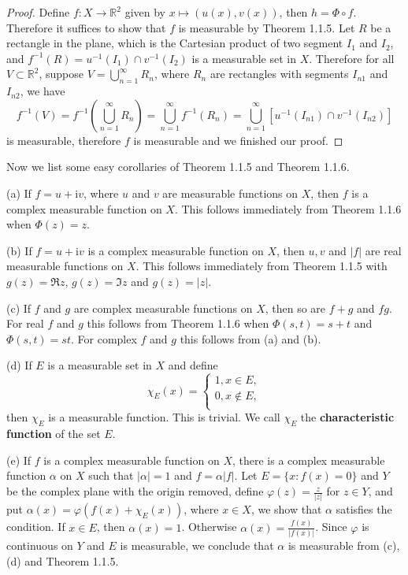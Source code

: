 \begin{proof}
Define $f:X\to\mathbb{R}^2$ given by $x\mapsto(u(x),v(x))$, then $h=\Phi\circ f$. Therefore it suffices to show that $f$ is measurable by Theorem 1.1.5. Let $R$ be a rectangle in the plane, which is the Cartesian product of two segment $I_1$ and $I_2$, and $f^{-1}\left( R \right) =u^{-1}\left( I_1 \right) \cap v^{-1}\left( I_2 \right) $ is a measurable set in $X$. Therefore for all $V\subset\mathbb{R}^2$, suppose $V=\bigcup_{n=1}^\infty R_n$, where $R_n$ are rectangles with segments $I_{n1}$ and $I_{n2}$, we have 
$$
f^{-1}\left( V \right) =f^{-1}\left( \bigcup_{n=1}^{\infty}{R_n} \right) =\bigcup_{n=1}^{\infty}{f^{-1}\left( R_n \right)}=\bigcup_{n=1}^{\infty}{\left[ u^{-1}\left( I_{n1} \right) \cap v^{-1}\left( I_{n2} \right) \right]}
$$
is measurable, therefore $f$ is measurable and we finished our proof.
\end{proof}
Now we list some easy corollaries of Theorem 1.1.5 and Theorem 1.1.6.\par
(a) If $f=u+\mathrm{i}v$, where $u$ and $v$ are measurable functions on $X$, then $f$ is a complex measurable function on $X$. This follows immediately from Theorem 1.1.6 when $\Phi(z)=z$.\par
(b) If $f=u+\mathrm{i}v$ is a complex measurable function on $X$, then $u,v$ and $|f|$ are real measurable functions on $X$. This follows immediately from Theorem 1.1.5 with $g(z)=\Re z$, $g(z)=\Im z$ and $g(z)=|z|$.\par
(c) If $f$ and $g$ are complex measurable functions on $X$, then so are $f+g$ and $fg$. For real $f$ and $g$ this follows from Theorem 1.1.6 when $\Phi(s,t)=s+t$ and $\Phi(s,t)=st$. For complex $f$ and $g$ this follows from (a) and (b).\par
(d) If $E$ is a measurable set in $X$ and define 
$$
\chi _E\left( x \right) =\begin{cases}
	1,x\in E,\\
	0,x\notin E,\\
\end{cases}
$$
then $\chi_E$ is a measurable function. This is trivial. We call $\chi_E$ the \textbf{characteristic function} of the set $E$.\par
(e) If $f$ is a complex measurable function on $X$, there is a complex measurable function $\alpha$ on $X$ such that $|\alpha|=1$ and $f=\alpha|f|$. Let $E=\{x:f(x)=0\}$ and $Y$ be the complex plane with the origin removed, define $\varphi(z)=\frac{z}{|z|}$ for $z\in Y$, and put $\alpha \left( x \right) =\varphi \left( f\left( x \right) +\chi _E\left( x \right) \right) $, where $x\in X$, we show that $\alpha$ satisfies the condition. If $x\in E$, then $\alpha(x)=1$. Otherwise $\alpha \left( x \right) =\frac{f\left( x \right)}{\left| f\left( x \right) \right|}$. Since $\varphi$ is continuous on $Y$ and $E$ is measurable, we conclude that $\alpha$ is measurable from (c), (d) and Theorem 1.1.5.\par
